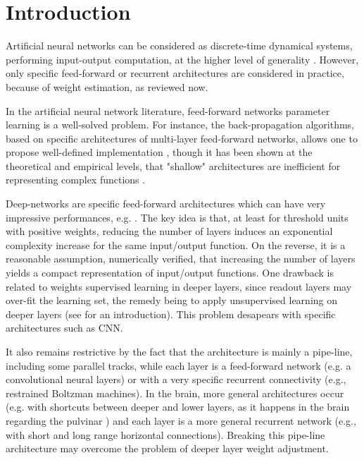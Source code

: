 \section*{Introduction}

Artificial neural networks can be considered as discrete-time
dynamical systems, performing input-output computation, at the higher
level of generality \cite{siegelmann_turing_1991}. However, only
specific feed-forward or recurrent architectures are considered in
practice, because of weight estimation, as reviewed now.

In the artificial neural network literature, feed-forward networks
parameter learning is a well-solved problem.  For instance, the back-propagation
algorithms, based on specific architectures of multi-layer
feed-forward networks, allows one to propose well-defined
implementation \cite{amit:89}, though it has been shown at the
theoretical and empirical levels, that "shallow" architectures are
 inefficient for representing complex functions
\cite{bengio-lecun:07}.

Deep-networks are specific feed-forward architectures
\cite{bengio-lecun:07} which can have very impressive performances,
e.g.  \cite{farabet_learning_2013}. The key idea
\cite{hstad_power_1991} is that, at least for threshold units with
positive weights, reducing the number of layers induces an exponential
complexity increase for the same input/output function. On the
reverse, it is a reasonable assumption, numerically verified, that
increasing the number of layers yields a compact representation of
input/output functions. One drawback is related to weights supervised
learning in deeper layers, since readout layers may over-fit the
learning set, the remedy being to apply unsupervised learning on
deeper layers (see \cite{Bengio:2009} for an introduction). This
problem desapears with specific architectures such as CNN.

It also remains restrictive by the fact that the architecture is
mainly a pipe-line, including some parallel tracks, while each layer
is a feed-forward network (e.g. a convolutional neural layers) or with
a very specific recurrent connectivity (e.g., restrained Boltzman
machines). In the brain, more general architectures occur (e.g.  with
shortcuts between deeper and lower layers, as it happens in the brain
regarding the pulvinar \cite{citeulike:1590763}) and each layer is a
more general recurrent network (e.g., with short and long range
horizontal connections). Breaking this pipe-line architecture may
overcome the problem of deeper layer weight adjustment.


